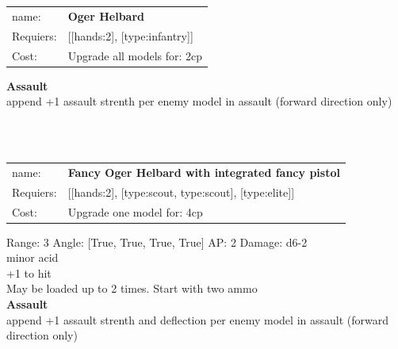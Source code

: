 \ \\
\ \\
\begin{tabular}{ll}
name: & {\bf Oger Helbard } \\
Requiers: & [[hands:2], [type:infantry]] \\
Cost: & Upgrade all models for: 2cp \\
\end{tabular}





{\bf Assault} \ \\

append +1 assault strenth per enemy model in assault (forward direction only)


\ \\
\ \\
\begin{tabular}{ll}
name: & {\bf Fancy Oger Helbard with integrated fancy pistol } \\
Requiers: & [[hands:2], [type:scout, type:scout], [type:elite]] \\
Cost: & Upgrade one model for: 4cp \\
\end{tabular}



Range: 3  Angle: [True, True, True, True] AP: 2 Damage: d6-2 \\
minor acid\\ 
+1 to hit\\ 
May be loaded up to 2 times. Start with two ammo\\ 



{\bf Assault} \ \\

append +1 assault strenth and deflection per enemy model in assault (forward direction only)


\ \\
